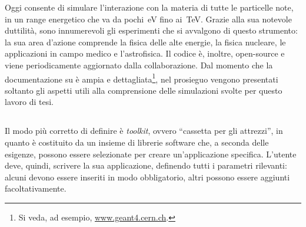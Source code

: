 Oggi \geant{} consente di simulare l'interazione con la materia di tutte le particelle note, in un range energetico che va da pochi~eV fino ai~TeV.
%
Grazie alla sua notevole duttilità, sono innumerevoli gli esperimenti che si avvalgono di questo strumento: la sua area d'azione comprende la fisica delle alte energie, la fisica nucleare, le applicazioni in campo medico e l'astrofisica.
Il codice è, inoltre, open-source e viene periodicamente aggiornato dalla collaborazione. 
Dal momento che la documentazione su \geant{} è ampia e dettagliata\footnote{Si veda, ad esempio, \url{www.geant4.cern.ch}.}, nel prosieguo vengono presentati soltanto gli aspetti utili alla comprensione delle simulazioni svolte per questo lavoro di tesi.  




\subsection{}

Il modo più corretto di definire \geant{} è \emph{toolkit}, ovvero ``cassetta per gli attrezzi'', in quanto è costituito da un insieme di librerie software che, a seconda delle esigenze, possono essere selezionate per creare un'applicazione specifica.
L'utente deve, quindi, scrivere la sua applicazione, definendo tutti i parametri rilevanti: alcuni devono essere inseriti in modo obbligatorio, altri possono essere aggiunti facoltativamente.

